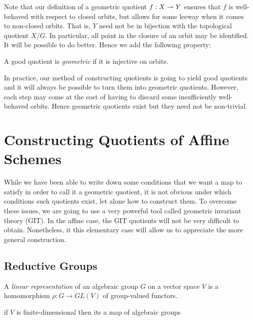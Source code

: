 \documentclass[12pt]{ociamthesis}  %
\begin{document}
Note that our definition of a geometric quotient $f : X\twoheadrightarrow Y$
ensures that $f$ is well-behaved with respect to closed orbits, but
allows for some leeway when it comes to non-closed orbits. That is,
$Y$ need not be in bijection with the topological quotient $X/G$. In particular,
all point in the closure of an orbit may be identified. It will be
possible to do better. Hence we add the following property:

\begin{definition}
  A good quotient is \emph{geometric} if it is injective on orbits.
\end{definition}

In practice, our method of constructing quotients is going to yield
good quotients and it will always be possible to turn them into geometric
quotients. However, each step may come at the cost of having to
discard some insufficiently well-behaved orbits. Hence geometric quotients
exist but they need not be non-trivial.

\section{Constructing Quotients of Affine Schemes}

While we have been able to write down some conditions that we want
a map to satisfy in order to call it a geometric quotient, it is not
obvious under which conditions such quotients exist, let alone how to
construct them. To overcome these issues, we are going to
use a very powerful tool called geometric invariant theory (GIT).
In the affine case, the GIT quotients will not be very difficult
to obtain. Nonetheless, it this elementary case will
allow us to appreciate the more general construction.

\subsection{Reductive Groups}

\begin{definition}
  A \emph{linear representation} of an algebraic group $G$
  on a vector space $V$ is a homomorphism
  $\rho : G \to GL(V)$ of group-valued functors.
\end{definition}

\begin{example}
  if $V$ is finite-dimensional then its a map of algebraic groups
  \missingexample
\end{example}
\end{document}
